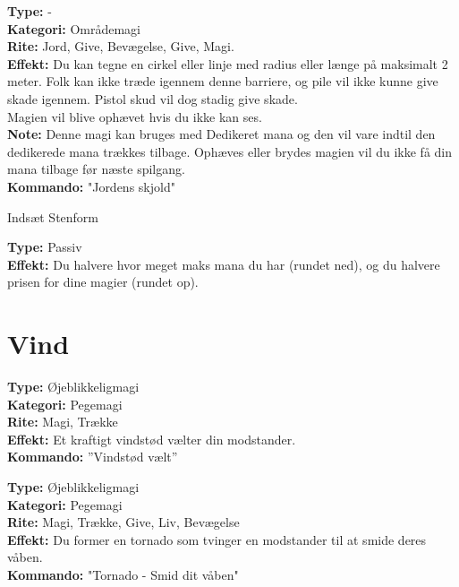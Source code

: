 \begin{jord*}
\textbf{Type:} -\\
\textbf{Kategori:} Områdemagi \\
\textbf{Rite:} Jord, Give, Bevægelse, Give, Magi.\\
\textbf{Effekt:} Du kan tegne en cirkel eller linje med radius eller længe på maksimalt 2 meter. Folk kan ikke træde igennem denne barriere, og pile vil ikke kunne give skade igennem. Pistol skud vil dog stadig give skade.\\
Magien vil blive ophævet hvis du ikke kan ses.\\
\textbf{Note:} Denne magi kan bruges med Dedikeret mana og den vil vare indtil den dedikerede mana trækkes tilbage. Ophæves eller brydes magien vil du ikke få din mana tilbage før næste spilgang.\\
\textbf{Kommando:} "Jordens skjold"
\end{jord*}

\begin{jord*}[Stenform]
    Indsæt Stenform
\end{jord*}

\begin{jord*}
\textbf{Type:} Passiv\\
\textbf{Effekt:} Du halvere hvor meget maks mana du har (rundet ned), og du halvere prisen for dine magier (rundet op).
\end{jord*}

\section{Vind}
\begin{vind*}[Vindstød]
\textbf{Type:} Øjeblikkeligmagi\\
\textbf{Kategori:} Pegemagi\\
\textbf{Rite:} Magi, Trække\\
\textbf{Effekt:} Et kraftigt vindstød vælter din modstander.\\ 
\textbf{Kommando:} ”Vindstød vælt”\\
\end{vind*}

\begin{vind*}[Tornado]
\textbf{Type:} Øjeblikkeligmagi\\
\textbf{Kategori:} Pegemagi\\
\textbf{Rite:} Magi, Trække, Give, Liv, Bevægelse\\
\textbf{Effekt:} Du former en tornado som tvinger en modstander til at smide deres våben.\\
\textbf{Kommando:} "Tornado - Smid dit våben"
\end{vind*}

